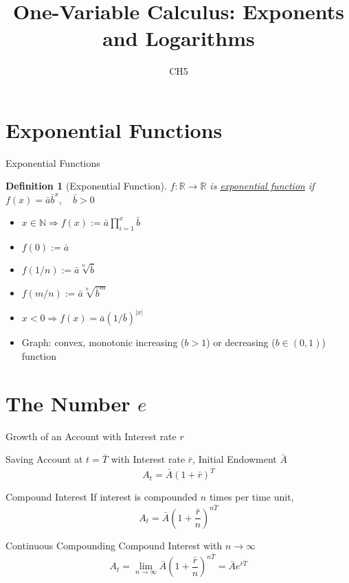 \documentclass[final]{beamer}
\author[조남운]{\mail}
\title{One-Variable Calculus: Exponents and Logarithms}
\subtitle{CH5}
\newtheorem{defn}{Definition}
\begin{document}
	
\maketitle


\section{Exponential Functions} %
\label{sec:exponential_functions}
\begin{frame}[t]{Exponential Functions}
	\begin{defn}
		[Exponential Function]
		$f:\mathbb{R}\rightarrow\mathbb{R}$ is \uline{exponential function} if $f(x)=\bar a \bar b^x,\quad \bar b>0$
	\end{defn}
	\begin{itemize}
		\item $x\in\mathbb{N}\Rightarrow f(x):=\bar a \prod_{i=1}^x \bar b$
		\item $f(0) := \bar a$
		\item $f(1/n):= \bar a \sqrt[n]{\bar b}$
		\item $f(m/n):= \bar a \sqrt[n]{\bar b^m}$
		\item $x<0 \Rightarrow f(x)=\bar a (1/\bar b)^{|x|}$
		\item Graph: convex, monotonic increasing ($b>1$) or decreasing ($b\in(0,1)$) function
	\end{itemize}
\end{frame}

\section{The Number $e$} %
\label{sec:the_number_e}
\begin{frame}[t]{Growth of an Account with Interest rate $r$}
	\begin{block}
		{Saving Account at $t=\bar T$ with Interest rate $\bar r$, Initial Endowment $\bar A$}
		\[
			A_t = \bar A \left(1+\bar r\right)^{\bar T}
		\]
	\end{block}
	\begin{block}
		{Compound Interest} If interest is compounded $n$ times per time unit, 
		\[
			A_t = \bar A \left(1+\frac{\bar r}{n}\right)^{n\bar T}
		\]
	\end{block}
	\begin{block}
		{Continuous Compounding} Compound Interest with $n\rightarrow \infty$
		\[
			A_t = \lim_{n\rightarrow \infty}\bar A \left(1+\frac{\bar r}{n}\right)^{n\bar T} = \bar A e^{\bar r\bar T}
		\]
	\end{block}
\end{frame}
\end{document}
